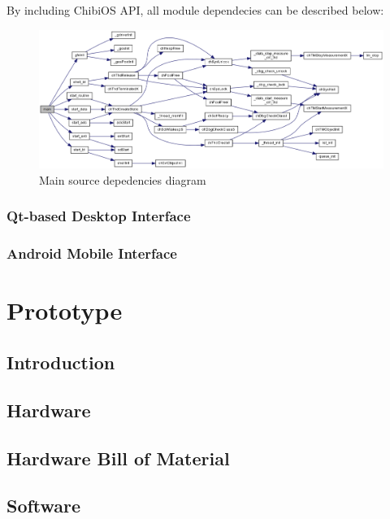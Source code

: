 \documentclass[12pt,]{book}
\begin{document}
	\newpage
	\begin{landscape}
		By including ChibiOS API, all module dependecies can be described below:
		\begin{figure}[H]
			\centering
			\includegraphics[width=\linewidth]{images/jw_ch_main}
			\caption{Main source depedencies diagram}
		\end{figure}
	\end{landscape}

	\newpage	
	\subsection{Qt-based Desktop Interface}
	
	\subsection{Android Mobile Interface}
	
	\newpage
	\chapter{Prototype}
	
	\section{Introduction}
	
	\section{Hardware}
	
	\section{Hardware Bill of Material}
		
	\section{Software}
	
\end{document}
